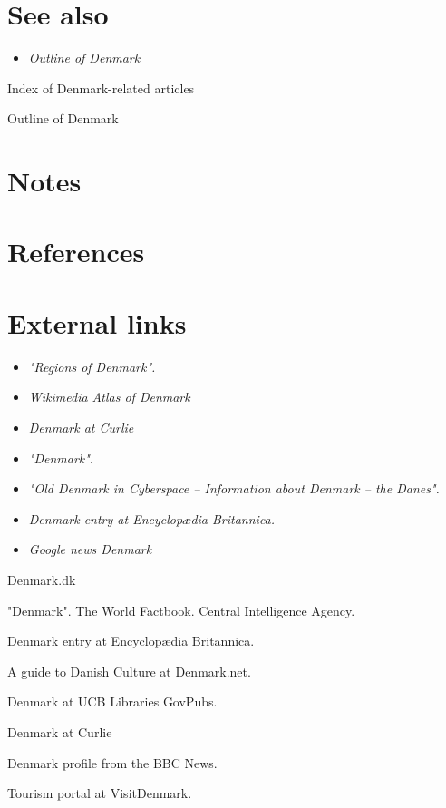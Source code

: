 \section{See also}\label{see-also}

\begin{itemize}
\item
  \emph{Outline of Denmark}
\end{itemize}

Index of Denmark-related articles

Outline of Denmark

\section{Notes}\label{notes}

\section{References}\label{references}

\section{External links}\label{external-links}

\begin{itemize}
\item
  \emph{"Regions of Denmark".}
\item
  \emph{Wikimedia Atlas of Denmark}
\item
  \emph{Denmark at Curlie}
\item
  \emph{"Denmark".}
\item
  \emph{"Old Denmark in Cyberspace -- Information about Denmark -- the
  Danes".}
\item
  \emph{Denmark entry at Encyclopædia Britannica.}
\item
  \emph{Google news Denmark}
\end{itemize}

Denmark.dk

"Denmark". The World Factbook. Central Intelligence Agency.

Denmark entry at Encyclopædia Britannica.

A guide to Danish Culture at Denmark.net.

Denmark at UCB Libraries GovPubs.

Denmark at Curlie

Denmark profile from the BBC News.

Tourism portal at VisitDenmark.

